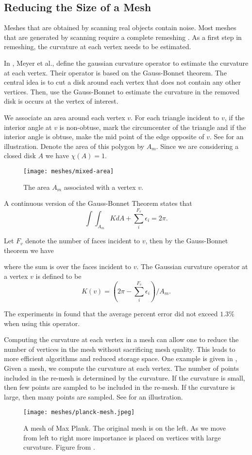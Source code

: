 \subsection{Reducing the Size of a Mesh}
\label{sec:removing}


Meshes that are obtained by scanning real objects contain noise.
Most meshes that are generated by scanning require a complete
remeshing \cite{remeshing-2003}.
As a first step in remeshing, the curvature at each
vertex needs to be estimated.

In \cite{mmsb-2003}, Meyer et al., define the gaussian curvature operator
to estimate the curvature at each vertex. Their operator is 
based on the Gauss-Bonnet theorem.
The central idea is to cut a disk around each vertex that does not contain
any other vertices. Then, use the Gauss-Bonnet
to estimate the curvature in the removed
disk is occurs at the vertex of interest.

We associate an area around each vertex $v$. 
For each triangle incident to $v$, if the interior 
angle at $v$ is non-obtuse, mark the circumcenter of the triangle
and if the interior angle is obtuse, make the mid point of the edge
opposite of $v$. See  for an illustration.
Denote the area of this polygon by $A_m.$
Since we are considering a closed disk $A$ we have $\chi(A)=1$.


\begin{figure}[htb]
\centering
\texttt{[image: meshes/mixed-area]}
\caption{The area $A_m$ associated with a vertex $v$.}
\label{fig:mixed-area}
\end{figure}

A continuous version of the Gauss-Bonnet Theorem
states that 
$$\int \int_{A_m}K dA +\sum_i^{F_v} \epsilon_i=2\pi.$$

Let $F_v$ denote the number of faces incident to $v$, 
then by the Gauss-Bonnet theorem we have


where the sum is over the faces incident to $v$.
The Gaussian curvature operator at a vertex $v$ is defined
to be
$$K(v)=\left( 2\pi -\sum_i^{F_v}\epsilon_i\right)/ A_m.$$

The experiments in \cite{mmsb-2003} found that the average
percent error did not exceed $1.3\%$ when using this operator.

Computing the curvature at each vertex in a mesh can allow one to reduce
the number of vertices in the mesh without sacrificing mesh quality.
This leads to more efficient algorithms and reduced storage space.
One example is given in \cite{alliez-2002},
Given a mesh, we compute the curvature at each vertex.
The number of points included in the re-mesh is determined
by the curvature. If the curvature is small, then few points
are sampled to be included in the re-mesh. If the curvature
is large, then many points are sampled. See 
for an illustration.

\begin{figure}[htb]
\centering
\texttt{[image: meshes/planck-mesh.jpeg]}
\caption{A mesh of Max Plank. The original mesh is on the left. As we move
from left to right more importance is placed on vertices with large curvature.
Figure from \cite{alliez-2002}.}
\label{fig:planck-mesh}
\end{figure}